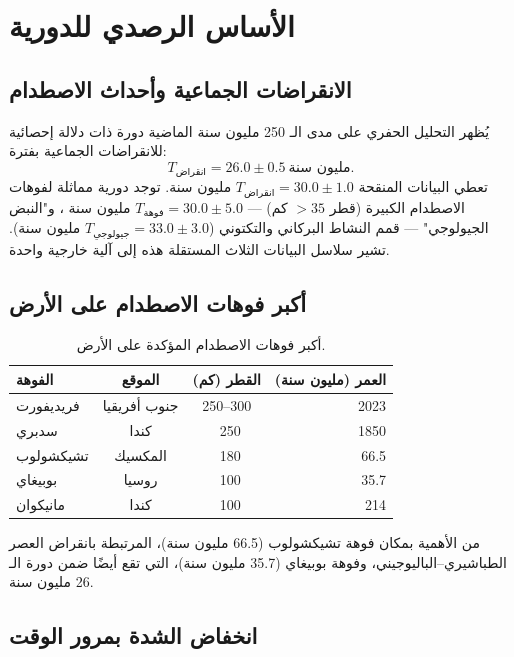 \documentclass[11pt,a4paper]{article}
\begin{document}
	\section{الأساس الرصدي للدورية}
	
	\subsection{الانقراضات الجماعية وأحداث الاصطدام}
	
	يُظهر التحليل الحفري على مدى الـ 250 مليون سنة الماضية \cite{Raup1984, Melott2010} دورة ذات دلالة إحصائية للانقراضات الجماعية بفترة:
	\[
	T_{\text{انقراض}} = 26.0 \pm 0.5\ \text{مليون سنة}.
	\]
	تعطي البيانات المنقحة \(T_{\text{انقراض}} = 30.0 \pm 1.0\) مليون سنة. توجد دورية مماثلة لفوهات الاصطدام الكبيرة (قطر \(>35\) كم) — \(T_{\text{فوهة}} = 30.0 \pm 5.0\) مليون سنة \cite{RampinoStothers1984}، و"النبض الجيولوجي" — قمم النشاط البركاني والتكتوني (\(T_{\text{جيولوجي}} = 33.0 \pm 3.0\) مليون سنة). تشير سلاسل البيانات الثلاث المستقلة هذه إلى آلية خارجية واحدة.
	
	\subsection{أكبر فوهات الاصطدام على الأرض}
	
	\begin{table}[htbp]
		\centering
		\caption{أكبر فوهات الاصطدام المؤكدة على الأرض.}
		\label{tab:craters}
		\footnotesize
		\begin{tabular}{lccr}
			\toprule
			\textbf{الفوهة} & \textbf{الموقع} & \textbf{القطر (كم)} & \textbf{العمر (مليون سنة)} \\
			\midrule
			فريديفورت & جنوب أفريقيا & 250–300 & 2023 \\
			سدبري & كندا & ~250 & 1850 \\
			تشيكشولوب & المكسيك & ~180 & 66.5 \\
			بوبيغاي & روسيا & ~100 & 35.7 \\
			مانيكوان & كندا & ~100 & 214 \\
			\bottomrule
		\end{tabular}
	\end{table}
	
	من الأهمية بمكان فوهة تشيكشولوب (66.5 مليون سنة)، المرتبطة بانقراض العصر الطباشيري–الباليوجيني، وفوهة بوبيغاي (35.7 مليون سنة)، التي تقع أيضًا ضمن دورة الـ 26 مليون سنة.
	
	\subsection{انخفاض الشدة بمرور الوقت}
	
\end{document}
